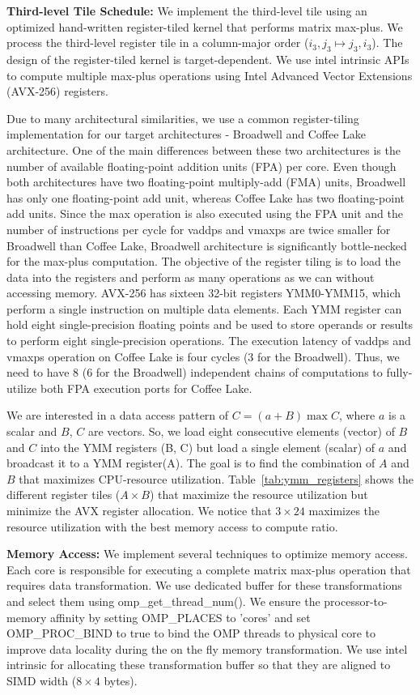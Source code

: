 \textbf{Third-level Tile Schedule:}
 We implement the third-level tile using an optimized hand-written register-tiled kernel that performs matrix max-plus. We process the third-level register tile in a column-major order ($i_{3}, j_{3} \mapsto {j_3}, i_{3}$).  The design of the register-tiled kernel is target-dependent. We use intel intrinsic APIs to compute multiple max-plus operations using Intel Advanced Vector Extensions (AVX-256) registers.

Due to many architectural similarities, we use a common register-tiling implementation for our target architectures - Broadwell and Coffee Lake architecture. One of the main differences between these two architectures is the number of available floating-point addition units (FPA) per core. Even though both architectures have two floating-point multiply-add (FMA) units, Broadwell has only one floating-point add unit, whereas Coffee Lake has two floating-point add units. Since the max operation is also executed using the FPA unit and the number of instructions per cycle for vaddps and vmaxps are twice smaller for Broadwell than Coffee Lake,  Broadwell architecture is significantly bottle-necked for the max-plus computation. The objective of the register tiling is to load the data into the registers and perform as many operations as we can without accessing memory. AVX-256 has sixteen 32-bit registers YMM0-YMM15, which perform a single instruction on multiple data elements. Each YMM register can hold eight single-precision floating points and be used to store operands or results to perform eight single-precision operations. The execution latency of vaddps and vmaxps operation on Coffee Lake is four cycles (3 for the Broadwell). Thus, we need to have 8 (6 for the Broadwell) independent chains of computations to fully-utilize both FPA execution ports for Coffee Lake.

We are interested in a data access pattern of $C = (a + B) \max C $, where $a$ is a scalar and $B$, $C$ are vectors. So, we load eight consecutive elements (vector) of $B$ and $C$ into the YMM registers (B, C) but load a single element (scalar) of $a$ and broadcast it to a YMM register(A). The goal is to find the combination of $A$ and $B$ that maximizes CPU-resource utilization. Table~\ref{tab:ymm_registers} shows the different register tiles ($ A\times B$) that maximize the resource utilization but minimize the AVX register allocation. We notice that $3 \times 24$ maximizes the resource utilization with the best memory access to compute ratio. 

\textbf{Memory Access:} We implement several techniques to optimize memory access. Each core is responsible for executing a complete matrix max-plus operation that requires data transformation. We use dedicated buffer for these  transformations  and select them using omp\_get\_thread\_num(). We ensure the processor-to-memory affinity by setting OMP\_PLACES to 'cores' and set OMP\_PROC\_BIND to true to bind the OMP threads to physical core to improve data locality during the on the fly memory transformation. We use intel intrinsic for allocating these transformation buffer so that they are aligned to SIMD width ($8 \times 4$ bytes).

